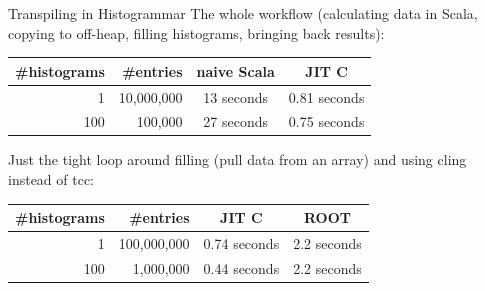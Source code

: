 \documentclass{beamer}
\begin{document}
\begin{frame}{Transpiling in Histogrammar}
\renewcommand{\arraystretch}{1.2}
\vfill
\vfill
The whole workflow (calculating data in Scala, copying to off-heap, filling histograms, bringing back results):

\begin{center}
\begin{tabular}{r r c c}
\#histograms & \#entries & naive Scala & JIT C \\\hline
1 & 10,000,000 & 13 seconds & 0.81 seconds \\
100 & 100,000 & 27 seconds & 0.75 seconds \\
\end{tabular}
\end{center}

\vfill
Just the tight loop around filling (pull data from an array) and using cling instead of tcc:

\begin{center}
\begin{tabular}{r r c c}
\#histograms & \#entries & JIT C & ROOT \\\hline
1 & 100,000,000 & 0.74 seconds & 2.2 seconds \\
100 & 1,000,000 & 0.44 seconds & 2.2 seconds \\
\end{tabular}
\end{center}
\end{frame}
\end{document}
